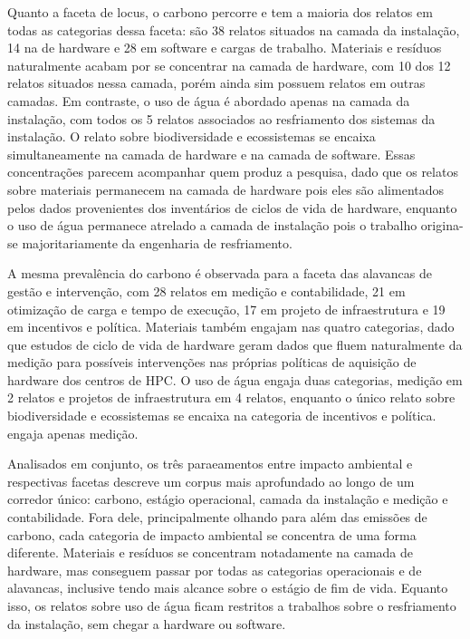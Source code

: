 Quanto a faceta de locus, o carbono percorre e tem a maioria dos relatos em todas as categorias dessa faceta:
são 38 relatos situados na camada da instalação, 14 na de hardware e 28 em software e cargas de trabalho. Materiais e resíduos naturalmente
acabam por se concentrar na camada de hardware, com 10 dos 12 relatos situados nessa camada, porém ainda sim possuem 
relatos em outras camadas. Em contraste, o uso de água é abordado apenas na camada da instalação, com todos os 5 relatos 
associados ao resfriamento dos sistemas da instalação. O relato sobre biodiversidade e ecossistemas se encaixa simultaneamente
na camada de hardware e na camada de software. Essas concentrações parecem acompanhar quem produz a pesquisa, 
dado que os relatos sobre materiais permanecem na camada de hardware pois eles são alimentados pelos dados provenientes
dos inventários de ciclos de vida de hardware, enquanto o uso de água permanece atrelado a camada de instalação pois
o trabalho origina-se majoritariamente da engenharia de resfriamento.

A mesma prevalência do carbono é observada para a faceta das alavancas de gestão e intervenção, com 28 relatos em medição e contabilidade,
21 em otimização de carga e tempo de execução, 17 em projeto de infraestrutura e 19 em incentivos e política. Materiais também engajam
nas quatro categorias, dado que estudos de ciclo de vida de hardware geram dados que fluem naturalmente da medição
para possíveis intervenções nas próprias políticas de aquisição de hardware dos centros de HPC. O uso de água engaja duas categorias,
medição em 2 relatos e projetos de infraestrutura em 4 relatos, enquanto o único relato sobre biodiversidade e ecossistemas se encaixa na categoria de incentivos e política.
engaja apenas medição.  

Analisados em conjunto, os três paraeamentos entre impacto ambiental e respectivas facetas descreve um corpus mais
aprofundado ao longo de um corredor único: carbono, estágio operacional, camada da instalação e medição e contabilidade.
Fora dele, principalmente olhando para além das emissões de carbono, cada categoria de impacto ambiental se concentra
de uma forma diferente. Materiais e resíduos se concentram notadamente na camada de hardware, mas conseguem passar por todas
as categorias operacionais e de alavancas, inclusive tendo mais alcance sobre o estágio de fim de vida. Equanto isso,
os relatos sobre uso de água ficam restritos a trabalhos sobre o resfriamento da instalação, sem chegar a hardware ou software.

